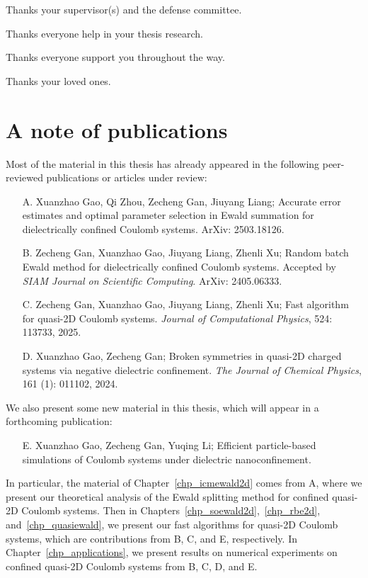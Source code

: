 Thanks your supervisor(s) and the defense committee. 

Thanks everyone help in your thesis research.

Thanks everyone support you throughout the way.

Thanks your loved ones.


\section*{A note of publications}

Most of the material in this thesis has already appeared in the following peer-reviewed publications or articles under review:
\begin{itemize}
    \item[A.] Xuanzhao Gao, Qi Zhou, Zecheng Gan, Jiuyang Liang; Accurate error estimates and optimal parameter selection in Ewald summation for dielectrically confined Coulomb systems. ArXiv: 2503.18126.
    \item[B.] Zecheng Gan, Xuanzhao Gao, Jiuyang Liang, Zhenli Xu; Random batch Ewald method for dielectrically confined Coulomb systems. Accepted by \emph{SIAM Journal on Scientific Computing}. ArXiv: 2405.06333.
    \item[C.] Zecheng Gan, Xuanzhao Gao, Jiuyang Liang, Zhenli Xu; Fast algorithm for quasi-2D Coulomb systems. \emph{Journal of Computational Physics}, 524: 113733, 2025.
    \item[D.] Xuanzhao Gao, Zecheng Gan; Broken symmetries in quasi-2D charged systems via negative dielectric confinement. \emph{The Journal of Chemical Physics}, 161 (1): 011102, 2024.
\end{itemize}
We also present some new material in this thesis, which will appear in a forthcoming publication:
\begin{itemize}
    \item[E.] Xuanzhao Gao, Zecheng Gan, Yuqing Li; Efficient particle-based simulations of Coulomb systems under dielectric nanoconfinement.
\end{itemize}
In particular, the material of Chapter~\ref{chp_icmewald2d} comes from A, where we present our theoretical analysis of the Ewald splitting method for confined quasi-2D Coulomb systems.
Then in Chapters~\ref{chp_soewald2d},~\ref{chp_rbe2d}, and~\ref{chp_quasiewald}, we present our fast algorithms for quasi-2D Coulomb systems, which are contributions from B, C, and E, respectively.
In Chapter~\ref{chp_applications}, we present results on numerical experiments on confined quasi-2D Coulomb systems from B, C, D, and E.